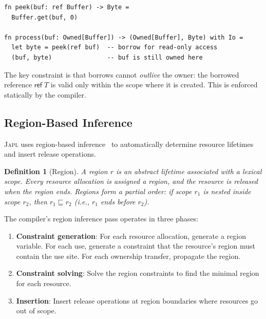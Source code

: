 \documentclass[11pt]{article}
\newtheorem{definition}[theorem]{Definition}
\newcommand{\JAPL}{\textsc{Japl}}
\newcommand{\rref}{\mathsf{ref}}
\begin{document}
\begin{lstlisting}[caption={Borrowing: peek at a buffer without consuming it},label={lst:borrow}]
fn peek(buf: ref Buffer) -> Byte =
  Buffer.get(buf, 0)

fn process(buf: Owned[Buffer]) -> (Owned[Buffer], Byte) with Io =
  let byte = peek(ref buf)  -- borrow for read-only access
  (buf, byte)               -- buf is still owned here
\end{lstlisting}

The key constraint is that borrows cannot \emph{outlive} the owner:
the borrowed reference $\rref\; T$ is valid only within the scope
where it is created.  This is enforced statically by the compiler.

\subsection{Region-Based Inference}\label{sec:region-inference}

\JAPL{} uses region-based inference~\cite{tofte1997region} to
automatically determine resource lifetimes and insert release
operations.

\begin{definition}[Region]\label{def:region}
A \emph{region} $r$ is an abstract lifetime associated with a lexical
scope.  Every resource allocation is assigned a region, and the
resource is released when the region ends.  Regions form a partial
order: if scope $r_1$ is nested inside scope $r_2$, then
$r_1 \sqsubseteq r_2$ (i.e., $r_1$ ends before $r_2$).
\end{definition}

The compiler's region inference pass operates in three phases:

\begin{enumerate}
  \item \textbf{Constraint generation}: For each resource allocation,
        generate a region variable.  For each use, generate a
        constraint that the resource's region must contain the use
        site.  For each ownership transfer, propagate the region.
  \item \textbf{Constraint solving}: Solve the region constraints to
        find the minimal region for each resource.
  \item \textbf{Insertion}: Insert release operations at region
        boundaries where resources go out of scope.
\end{enumerate}
\end{document}
